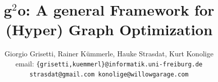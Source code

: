 \documentclass[a4paper]{article}
\begin{document}


\newcommand{\gopt}{g\ensuremath{^2}o}
\newcommand{\defeq}{\stackrel{\text{def.}}{=}}
\newcommand{\gcomment}[1]{\textcolor{red}{\textbf{Giorgio:}~\emph{#1}}}
\newcommand{\rcomment}[1]{\textcolor{red}{\textbf{Rainer:}~\emph{#1}}}

\def\secref#1{Section~\ref{#1}}
\def\figref#1{Figure~\ref{#1}}
\def\tabref#1{Table~\ref{#1}}
\def\eqref#1{Eq.~\ref{#1}}

\newcommand{\Dom}{\mathtt{Dom}}
\newcommand{\bZero}{\mathbf{0}}
\newcommand{\bb}{\mathbf{b}}
\newcommand{\bc}{\mathbf{c}}
\newcommand{\bh}{\mathbf{h}}
\newcommand{\bH}{\mathbf{H}}
\newcommand{\bA}{\mathbf{A}}
\newcommand{\bM}{\mathbf{M}}
\newcommand{\bF}{\mathbf{F}}
\newcommand{\bG}{\mathbf{G}}
\newcommand{\bI}{\mathbf{I}}
\newcommand{\bB}{\mathbf{B}}
\newcommand{\bR}{\mathbf{R}}
\newcommand{\bp}{\mathbf{p}}
\newcommand{\bq}{\mathbf{q}}
\newcommand{\bqTilde}{\mathbf{\tilde q}}
\newcommand{\ec}{\mathbf{e}}
\newcommand{\be}{\mathbf{e}}
\newcommand{\br}{\mathbf{r}}
\newcommand{\bx}{\mathbf{x}}
\newcommand\bbx{\breve{\bx}}
\newcommand{\bu}{\mathbf{u}}
\newcommand{\bz}{\mathbf{z}}
\newcommand{\bt}{\mathbf{t}}
\newcommand{\bDeltax}{\mathbf{\Delta x}}
\newcommand{\bDeltaAlpha}{\mathbf{\Delta \alpha}}
\newcommand{\bDeltaAlphaTilde}{\mathbf{\Delta\tilde\alpha}}
\newcommand{\bTDeltax}{\mathbf{\Delta \tilde x}}
\newcommand{\bDelta}{\mathbf{\Delta}}
\newcommand{\balpha}{\mathbf{\alpha}}
\newcommand{\bOmega}{\mathbf{\Omega}}
\newcommand{\bSigma}{\mathbf{\Sigma}}
\newcommand{\bJ}{\mathbf{J}}
\newcommand{\diff}{\partial}
\def\argmax{\mathop{\rm argmax}}
\def\argmin{\mathop{\rm argmin}}

\newcommand{\Rstar}{{\cal R} }
\newcommand{\Rx}{R}
\newcommand{\tx}{t}

\newcommand{\angleOf}{\mathbf{angleOf}}
\newcommand{\axisOf}{\mathbf{axisOf}}
\newcommand{\slerp}{\mathbf{slerp}}

\title{\gopt: A general Framework for (Hyper) Graph Optimization}
\author{Giorgio Grisetti, Rainer K\"ummerle, Hauke Strasdat, Kurt Konolige\\
	email: \texttt{\{grisetti,kuemmerl\}@informatik.uni-freiburg.de}\\
        \texttt{strasdat@gmail.com konolige@willowgarage.com}
}
\maketitle
\end{document}
